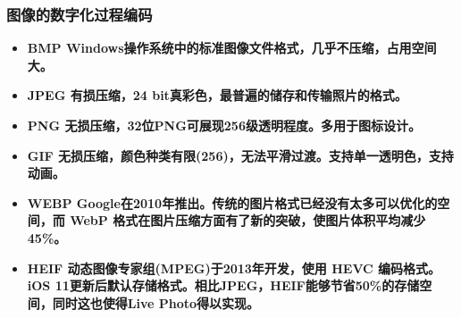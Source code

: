 \begin{frame}
    \frametitle{图像的数字化过程\quad {}编码}
    \begin{itemize}
      \item \bf{BMP} Windows操作系统中的标准图像文件格式，几乎不压缩，占用空间大。
      \item \bf{JPEG} 有损压缩，24 bit真彩色，最普遍的储存和传输照片的格式。
      \item \bf{PNG} 无损压缩，32位PNG可展现256级透明程度。多用于图标设计。
      \item \bf{GIF} 无损压缩，颜色种类有限(256)，无法平滑过渡。支持单一透明色，支持动画。
      \item \bf{WEBP} Google在2010年推出。传统的图片格式已经没有太多可以优化的空间，而 WebP 格式在图片压缩方面有了新的突破，使图片体积平均减少45\%。
      \item \bf{HEIF} 动态图像专家组(MPEG)于2013年开发，使用 HEVC 编码格式。iOS 11更新后默认存储格式。相比JPEG，HEIF能够节省50\%的存储空间，同时这也使得Live Photo得以实现。
    \end{itemize}
\end{frame}

